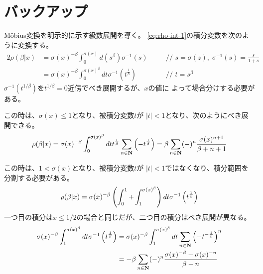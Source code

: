 \section{バックアップ}\label{s1:バックアップ} %
\begin{description}\setlength{\itemsep}{-1mm} %
	\item[級数展開] M\"obius変換を明示的に示す級数展開を導く。
	\eqref{eq:rho-int-1}の積分変数を次のように変換する。
	\begin{alignat*}{2}
		\rho(\beta|x) 
		&= \sigma(x)^{-\beta}\int_0^{\sigma(x)} d(s^\beta)\sigma^{-1}(s)
		&\quad&\text{// } s = \sigma(z),\;\sigma^{-1}(s) = \frac{s}{1 + s} \\
		&= \sigma(x)^{-\beta}\int_0^{\sigma(x)^\beta} dt\sigma^{-1}(t^{\frac{1}{\beta}})
		&\quad&\text{// } t = s^\beta
	\end{alignat*}
	$\sigma^{-1}(t^{1/\beta})$を$t^{1/\beta}=0$近傍でべき展開するが、$x$の値に
	よって場合分けする必要がある。
	\begin{description}\setlength{\itemsep}{-1mm} %
		\item[$x\le 1/2$の時] この時は、$\sigma(x)\le 1$となり、被積分変数$t$が
		$|t|<1$となり、次のようにべき展開できる。
		\begin{equation*}
			\rho(\beta|x) = \sigma(x)^{-\beta}\int_0^{\sigma(x)^\beta} dt 
				t^{\frac{1}{\beta}}\sum_{n\in\mathbf{N}} \mathinner{\left({- t^{\frac{1}{\beta}}}\right)}
			= \beta \sum_{n\in\mathbf{N}} (-)^n\frac{\sigma(x)^{n + 1}}{\beta + n + 1}
		\end{equation*}
		\item[$1/2< x$の時] この時は、$1<\sigma(x)$となり、被積分変数$t$が
		$|t|<1$ではなくなり、積分範囲を分割する必要がある。
		\begin{equation*}\begin{split}
			\rho(\beta|x) 
			= \sigma(x)^{-\beta}\mathinner{\left({\int_0^1 + \int_1^{\sigma(x)^\beta}}\right)} dt 
			\sigma^{-1}\mathinner{\left({t^{\frac{1}{\beta}}}\right)}
		\end{split}\end{equation*}
		一つ目の積分は$x\le1/2$の場合と同じだが、二つ目の積分はべき展開が異なる。
		\begin{equation*}\begin{split}
			\sigma(x)^{-\beta}\int_1^{\sigma(x)^\beta}dt
				\sigma^{-1}\plra{t^{\frac{1}{\beta}}}
			&= \sigma(x)^{-\beta}\int_1^{\sigma(x)^\beta}dt
				\sum_{n\in\sizen}\plra{- t^{- \frac{1}{\beta}}}^n \\
			&= - \beta\sum_{n\in\sizen}(-)^n
				\frac{\sigma(x)^{- \beta} - \sigma(x)^{- n}}{\beta - n}

\end{split}
\end{equation*}
\end{description}
\end{description}

